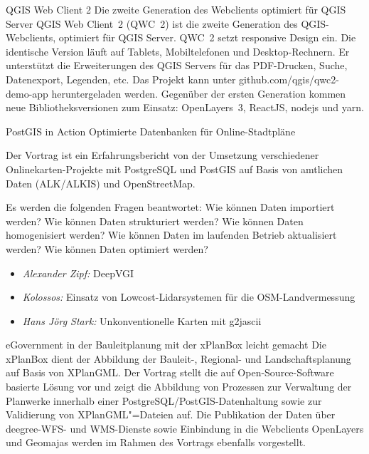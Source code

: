 %
{QGIS Web Client 2}%
{Die zweite Generation des Webclients optimiert für QGIS Server}%
{QGIS Web Client~2 (QWC~2) ist die zweite Generation des QGIS-Webclients,
optimiert für QGIS Server. QWC~2 setzt responsive Design ein. Die
identische Version läuft auf Tablets, Mobiltelefonen und
Desktop-Rechnern. Er unterstützt die Erweiterungen des QGIS Servers für
das PDF-Drucken, Suche, Datenexport, Legenden, etc. Das Projekt kann
unter github.com/qgis/qwc2-demo-app heruntergeladen werden.
Gegenüber der ersten Generation kommen neue Bibliotheksversionen zum
Einsatz: OpenLayers~3, ReactJS, nodejs und yarn.}

%
{PostGIS in Action}%
{Optimierte Datenbanken für Online-Stadtpläne}%
{Der Vortrag ist ein Erfahrungsbericht von der Umsetzung verschiedener Onlinekarten-Projekte mit
  PostgreSQL und PostGIS auf Basis von amtlichen Daten (ALK/ALKIS) und OpenStreetMap. 

Es werden die folgenden Fragen beantwortet: Wie können Daten importiert werden? Wie können Daten
strukturiert werden? Wie können Daten homogenisiert werden? Wie können Daten im laufenden Betrieb
aktualisiert werden? Wie können Daten optimiert werden?}

%
{%
  \vspace{-2em}
  \begin{itemize}
    \RaggedRight
    \setlength{\itemsep}{-0.25\baselineskip} %
    \item \emph{Alexander Zipf:} DeepVGI
    \item \emph{Kolossos:} Einsatz von Lowcost-Lidarsystemen für die OSM-Landvermessung
    \item \emph{Hans Jörg Stark:} Unkonventionelle Karten mit g2jascii
  \end{itemize}
}



%
{eGovernment in der Bauleitplanung mit der xPlanBox leicht gemacht}%
{}%
{Die xPlanBox dient der Abbildung der Bauleit-, Regional- und Landschaftsplanung auf Basis von
XPlanGML. Der Vortrag stellt die auf Open-Source-Software basierte Lösung vor und zeigt die
Abbildung von Prozessen zur Verwaltung der Planwerke innerhalb einer PostgreSQL/PostGIS-Datenhaltung
sowie zur Validierung von XPlanGML"=Dateien auf. Die Publikation der Daten über deegree-WFS- und
WMS-Dienste sowie Einbindung in die Webclients OpenLayers und Geomajas werden im Rahmen des Vortrags
ebenfalls vorgestellt.}

